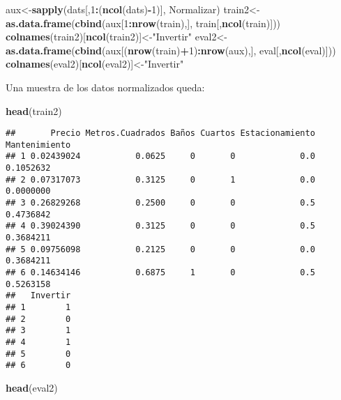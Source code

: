 \documentclass[]{article}
\newenvironment{Shaded}{\begin{snugshade}}{\end{snugshade}}
\newcommand{\KeywordTok}[1]{\textcolor[rgb]{0.13,0.29,0.53}{\textbf{#1}}}
\newcommand{\DecValTok}[1]{\textcolor[rgb]{0.00,0.00,0.81}{#1}}
\newcommand{\StringTok}[1]{\textcolor[rgb]{0.31,0.60,0.02}{#1}}
\newcommand{\OperatorTok}[1]{\textcolor[rgb]{0.81,0.36,0.00}{\textbf{#1}}}
\newcommand{\NormalTok}[1]{#1}
\begin{document}
\begin{Shaded}
\begin{Highlighting}[]
\NormalTok{aux<-}\KeywordTok{sapply}\NormalTok{(dats[,}\DecValTok{1}\OperatorTok{:}\NormalTok{(}\KeywordTok{ncol}\NormalTok{(dats)}\OperatorTok{-}\DecValTok{1}\NormalTok{)], Normalizar)}
\NormalTok{train2<-}\KeywordTok{as.data.frame}\NormalTok{(}\KeywordTok{cbind}\NormalTok{(aux[}\DecValTok{1}\OperatorTok{:}\KeywordTok{nrow}\NormalTok{(train),], train[,}\KeywordTok{ncol}\NormalTok{(train)]))}
\KeywordTok{colnames}\NormalTok{(train2)[}\KeywordTok{ncol}\NormalTok{(train2)]<-}\StringTok{"Invertir"}
\NormalTok{eval2<-}\KeywordTok{as.data.frame}\NormalTok{(}\KeywordTok{cbind}\NormalTok{(aux[(}\KeywordTok{nrow}\NormalTok{(train)}\OperatorTok{+}\DecValTok{1}\NormalTok{)}\OperatorTok{:}\KeywordTok{nrow}\NormalTok{(aux),], eval[,}\KeywordTok{ncol}\NormalTok{(eval)]))}
\KeywordTok{colnames}\NormalTok{(eval2)[}\KeywordTok{ncol}\NormalTok{(eval2)]<-}\StringTok{"Invertir"}
\end{Highlighting}
\end{Shaded}

Una muestra de los datos normalizados queda:

\begin{Shaded}
\begin{Highlighting}[]
\KeywordTok{head}\NormalTok{(train2)}
\end{Highlighting}
\end{Shaded}

\begin{verbatim}
##       Precio Metros.Cuadrados Baños Cuartos Estacionamiento Mantenimiento
## 1 0.02439024           0.0625     0       0             0.0     0.1052632
## 2 0.07317073           0.3125     0       1             0.0     0.0000000
## 3 0.26829268           0.2500     0       0             0.5     0.4736842
## 4 0.39024390           0.3125     0       0             0.5     0.3684211
## 5 0.09756098           0.2125     0       0             0.0     0.3684211
## 6 0.14634146           0.6875     1       0             0.5     0.5263158
##   Invertir
## 1        1
## 2        0
## 3        1
## 4        1
## 5        0
## 6        0
\end{verbatim}

\begin{Shaded}
\begin{Highlighting}[]
\KeywordTok{head}\NormalTok{(eval2)}
\end{Highlighting}
\end{Shaded}
\end{document}
